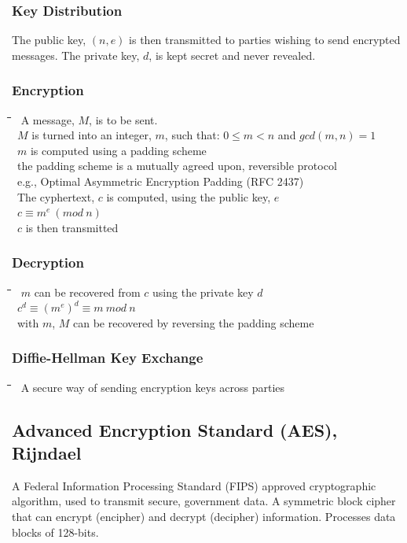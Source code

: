 \documentclass[10pt,letterpaper]{scrartcl}
\newcommand{\tbul}{\textbullet}
\newcommand{\tend}{\>\textendash}
\newcommand{\tasc}{\>\>\textasteriskcentered}
\newcommand{\tabDef}{\hspace{2em}\=\hspace{2em}\=\hspace{2em}\=\hspace{2em}\=\kill}
\begin{document}
\subsubsection{Key Distribution}
The public key, $(n, e)$ is then transmitted to parties wishing to send encrypted messages. The private key, $d$, is kept secret and never revealed.
\subsubsection{Encryption}\begin{tabbing}\tabDef 
\tbul\ A message, $M$, is to be sent. \\
\tbul\ $M$ is turned into an integer, $m$, such that: $0 \leq m < n$ and $gcd(m, n) = 1$ \\
	\tend\ $m$ is computed using a padding scheme \\
    	\tasc\ the padding scheme is a mutually agreed upon, reversible protocol\\
        \tasc\ e.g., Optimal Asymmetric Encryption Padding (RFC 2437)\\
\tbul\ The cyphertext, $c$ is computed, using the public key, $e$ \\
	\tend\ $\displaystyle c \equiv m^e \ (mod \ n)$ \\
\tbul\ $c$ is then transmitted\end{tabbing}
\subsubsection{Decryption}\begin{tabbing}\tabDef 
\tbul\ $m$ can be recovered from $c$ using the private key $d$ \\
	\tend\ $\displaystyle c^d\equiv (m^e)^d\equiv m \ mod \ n$ \\
\tbul\ with $m$, $M$ can be recovered by reversing the padding scheme\end{tabbing}
\subsubsection{Diffie-Hellman Key Exchange}
\begin{tabbing}\tabDef 
\tbul\ A secure way of sending encryption keys across parties
\end{tabbing}

\subsection{Advanced Encryption Standard (AES), Rijndael}
A Federal Information Processing Standard (FIPS) approved cryptographic algorithm, used to transmit secure, government data. A symmetric block cipher that can encrypt (encipher) and decrypt (decipher) information. Processes data blocks of 128-bits.
\end{document}
